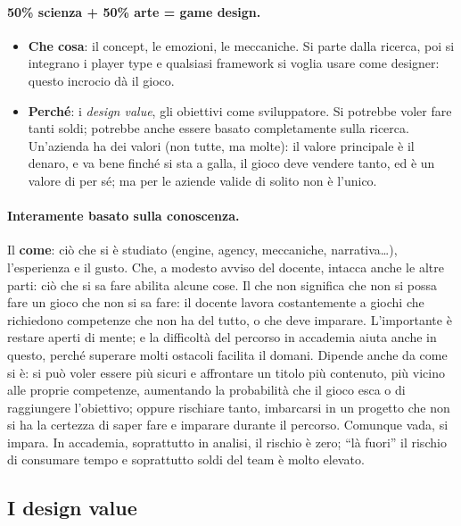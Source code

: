 \paragraph{50\% scienza + 50\% arte = game design.}
\begin{itemize}
  \item \textbf{Che cosa}: il concept, le emozioni, le meccaniche. Si parte dalla
        ricerca, poi si integrano i player type e qualsiasi framework si voglia usare
        come designer: questo incrocio dà il gioco.
  \item \textbf{Perché}: i \emph{design value}, gli obiettivi come sviluppatore. Si
        potrebbe voler fare tanti soldi; potrebbe anche essere basato completamente
        sulla ricerca. Un'azienda ha dei valori (non tutte, ma molte): il valore
        principale è il denaro, e va bene finché si sta a galla, il gioco deve
        vendere tanto, ed è un valore di per sé; ma per le aziende valide di solito
        non è l'unico.
\end{itemize}

\paragraph{Interamente basato sulla conoscenza.} Il \textbf{come}: ciò che si è
studiato (engine, agency, meccaniche, narrativa\dots), l'esperienza e il gusto. Che, a
modesto avviso del docente, intacca anche le altre parti: ciò che si sa fare abilita
alcune cose. Il che non significa che non si possa fare un gioco che non si sa fare:
il docente lavora costantemente a giochi che richiedono competenze che non ha del
tutto, o che deve imparare. L'importante è restare aperti di mente; e la difficoltà
del percorso in accademia aiuta anche in questo, perché superare molti ostacoli
facilita il domani. Dipende anche da come si è: si può voler essere più sicuri e
affrontare un titolo più contenuto, più vicino alle proprie competenze, aumentando la
probabilità che il gioco esca o di raggiungere l'obiettivo; oppure rischiare tanto,
imbarcarsi in un progetto che non si ha la certezza di saper fare e imparare durante
il percorso. Comunque vada, si impara. In accademia, soprattutto in analisi, il
rischio è zero; ``là fuori'' il rischio di consumare tempo e soprattutto soldi del
team è molto elevato.


\subsection{I design value}

